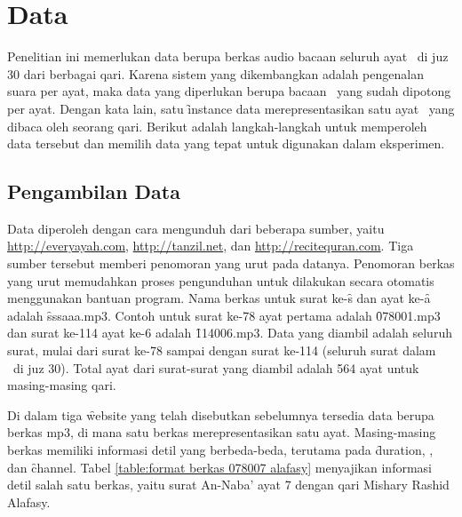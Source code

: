 \section{Data}
Penelitian ini memerlukan data berupa berkas audio bacaan seluruh ayat \quran~di juz 30 dari berbagai qari. Karena sistem yang dikembangkan adalah pengenalan suara per ayat, maka data yang diperlukan berupa bacaan \quran~yang sudah dipotong per ayat. Dengan kata lain, satu \f{instance} data merepresentasikan satu ayat \quran~yang dibaca oleh seorang qari. Berikut adalah langkah-langkah untuk memperoleh data tersebut dan memilih data yang tepat untuk digunakan dalam eksperimen.

  \subsection{Pengambilan Data} \label{pengambilan data}
  Data diperoleh dengan cara mengunduh dari beberapa sumber, yaitu \url{http://everyayah.com}, \url{http://tanzil.net}, dan \url{http://recitequran.com}. Tiga sumber tersebut memberi penomoran yang urut pada datanya. Penomoran berkas yang urut memudahkan proses pengunduhan untuk dilakukan secara otomatis menggunakan bantuan program. Nama berkas untuk surat ke-\f{s} dan ayat ke-\f{a} adalah \f{sssaaa.mp3}. Contoh untuk surat ke-78 ayat pertama adalah \f{078001.mp3} dan surat ke-114 ayat ke-6 adalah \f{114006.mp3}. Data yang diambil adalah seluruh surat, mulai dari surat ke-78 sampai dengan surat ke-114 (seluruh surat dalam \quran~di juz 30). Total ayat dari surat-surat yang diambil adalah 564 ayat untuk masing-masing qari.

  Di dalam tiga \f{website} yang telah disebutkan sebelumnya tersedia data berupa berkas mp3, di mana satu berkas merepresentasikan satu ayat. Masing-masing berkas memiliki informasi detil yang berbeda-beda, terutama pada \f{duration}, \br, dan \f{channel}. Tabel \ref{table:format berkas 078007 alafasy} menyajikan informasi detil salah satu berkas, yaitu surat An-Naba' ayat 7 dengan qari Mishary Rashid Alafasy.

